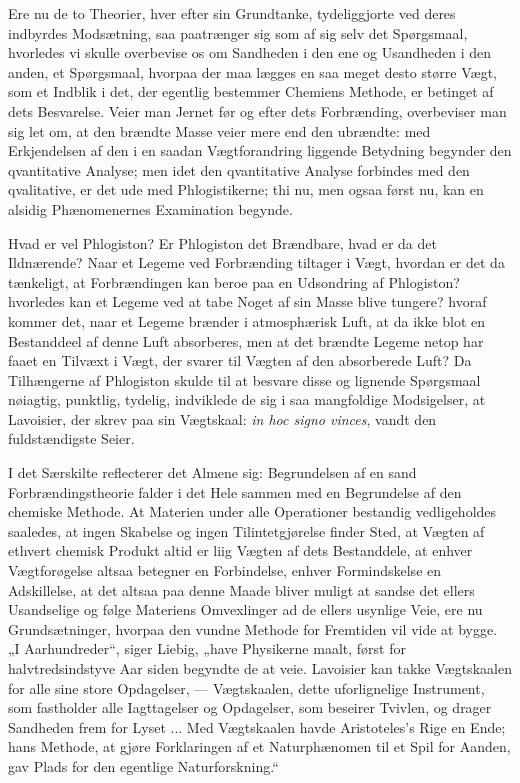 \documentclass[12pt,a4paper]{book}
\begin{document}
Ere nu de to Theorier, hver efter sin Grundtanke, tydeliggjorte
ved deres indbyrdes Modsætning, saa paatrænger sig som af sig selv
det Spørgsmaal, hvorledes vi skulle overbevise os om Sandheden i
den ene og Usandheden i den anden, et Spørgsmaal, hvorpaa der maa
lægges en saa meget desto større Vægt, som et Indblik i det, der
egentlig bestemmer Chemiens Methode, er betinget af dets
Besvarelse. Veier man Jernet før og efter dets Forbrænding,
overbeviser man sig let om, at den brændte Masse veier mere end den
ubrændte: med Erkjendelsen af den i en saadan Vægtforandring
liggende Betydning begynder den qvantitative Analyse; men idet den
qvantitative Analyse forbindes med den qvalitative, er det ude med
Phlogistikerne; thi nu, men ogsaa først nu, kan en alsidig
Phænomenernes Examination begynde.

Hvad er vel Phlogiston? Er Phlogiston det Brændbare, hvad er da
det Ildnærende? Naar et Legeme ved Forbrænding tiltager i Vægt,
hvordan er det da tænkeligt, at Forbrændingen kan beroe paa en
Udsondring af Phlogiston? hvorledes kan et
\setcounter{footnote}{0}
Legeme ved at tabe Noget af sin Masse blive tungere? hvoraf kommer
det, naar et Legeme brænder i atmosphærisk Luft, at da ikke blot en
Bestanddeel af denne Luft absorberes, men at det brændte Legeme
netop har faaet en Tilvæxt i Vægt, der svarer til Vægten af den
absorberede Luft? Da Tilhængerne af Phlogiston skulde til at
besvare disse og lignende Spørgsmaal nøiagtig, punktlig, tydelig,
indviklede de sig i saa mangfoldige Modsigelser, at Lavoisier, der
skrev paa sin Vægtskaal: \textit{in hoc signo vinces}, vandt den
fuldstændigste Seier.

I det Særskilte reflecterer det Almene sig: Begrundelsen af en
sand Forbrændingstheorie falder i det Hele sammen med en
Begrundelse af den chemiske Methode. At Materien under alle
Operationer bestandig vedligeholdes saaledes, at ingen Skabelse og
ingen Tilintetgjørelse finder Sted, at Vægten af ethvert chemisk
Produkt altid er liig Vægten af dets Bestanddele, at enhver
Vægtforøgelse altsaa betegner en Forbindelse, enhver Formindskelse
en Adskillelse, at det altsaa paa denne Maade bliver muligt at
sandse det ellers Usandselige og følge Materiens Omvexlinger ad de
ellers usynlige Veie, ere nu Grundsætninger, hvorpaa den vundne
Methode for Fremtiden vil vide at bygge. „I Aarhundreder“, siger
Liebig, „have Physikerne maalt, først for halvtredsindstyve Aar
siden begyndte de at veie. Lavoisier kan takke Vægtskaalen for alle
sine store Opdagelser, --- Vægtskaalen, dette uforlignelige
Instrument, som fastholder alle Iagttagelser og Opdagelser, som
beseirer Tvivlen, og drager Sandheden frem for Lyset ... Med
Vægtskaalen havde Aristoteles's Rige en Ende; hans Methode, at
gjøre Forklaringen af et Naturphænomen til et Spil for Aanden, gav
Plads for den egentlige Naturforskning.“
\end{document}
